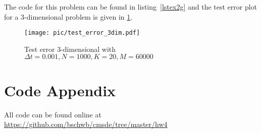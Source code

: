\documentclass[a4paper,11pt]{scrartcl}
\newcommand*{\Dt}{\Delta{}t}
\begin{document}
\begin{enumerate}
\begin{enumerate}[leftmargin=1em]
      The code for this problem can be found in listing~\ref{lstex2g} and the
      test error plot for a 3-dimensional problem is given in \cref{fig:multidim}.

    \begin{figure}[H]
      \centering
      \texttt{[image: pic/test\_error\_3dim.pdf]}
      \caption{Test error 3-dimensional with $\Dt=0.001, N=1000, K=20, M=60000$}
      \label{fig:multidim}
    \end{figure}
\end{enumerate}

\end{enumerate}
 
\section*{Code Appendix}

All code can be found online at
\url{https://github.com/bschwb/cmsde/tree/master/hw4}




\end{document}
